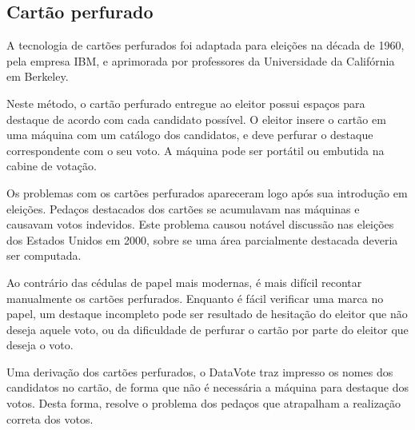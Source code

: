 \subsection{Cartão perfurado}

A tecnologia de cartões perfurados foi adaptada para eleições na década de 1960, pela empresa IBM, e aprimorada por professores da Universidade da Califórnia em Berkeley.

Neste método, o cartão perfurado entregue ao eleitor possui espaços para destaque de acordo com cada candidato possível. O eleitor insere o cartão em uma máquina com um catálogo dos candidatos, e deve perfurar o destaque correspondente com o seu voto. A máquina pode ser portátil ou embutida na cabine de votação.

Os problemas com os cartões perfurados apareceram logo após sua introdução em eleições. Pedaços destacados dos cartões se acumulavam nas máquinas e causavam votos indevidos. Este problema causou notável discussão nas eleições dos Estados Unidos em 2000, sobre se uma área parcialmente destacada deveria ser computada.

Ao contrário das cédulas de papel mais modernas, é mais difícil recontar manualmente os cartões perfurados. Enquanto é fácil verificar uma marca no papel, um destaque incompleto pode ser resultado de hesitação do eleitor que não deseja aquele voto, ou da dificuldade de perfurar o cartão por parte do eleitor que deseja o voto.

Uma derivação dos cartões perfurados, o DataVote traz impresso os nomes dos candidatos no cartão, de forma que não é necessária a máquina para destaque dos votos. Desta forma, resolve o problema dos pedaços que atrapalham a realização correta dos votos.